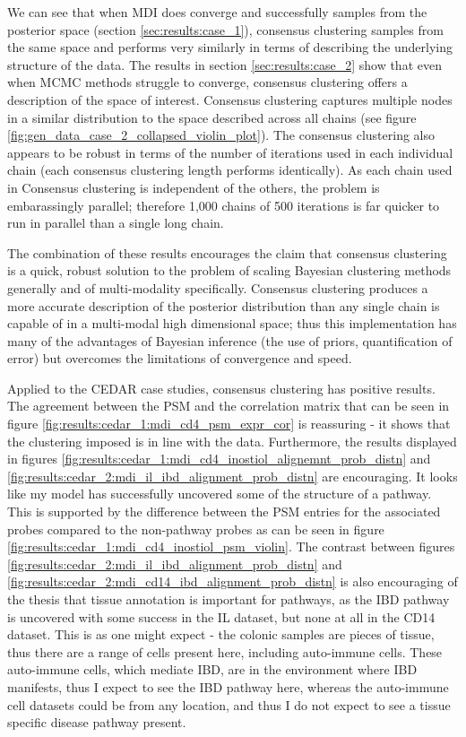 \documentclass[12pt]{article} %
\begin{document}
	We can see that when MDI does converge and successfully samples from the posterior space (section \ref{sec:results:case_1}), consensus clustering samples from the same space and performs very similarly in terms of describing the underlying structure of the data. The results in section \ref{sec:results:case_2} show that even when MCMC methods struggle to converge, consensus clustering offers a description of the space of interest. Consensus clustering captures multiple nodes in a similar distribution to the space described across all chains (see figure \ref{fig:gen_data_case_2_collapsed_violin_plot}). The consensus clustering also appears to be robust in terms of the number of iterations used in each individual chain (each consensus clustering length performs identically). As each chain used in Consensus clustering is independent of the others, the problem is embarassingly parallel; therefore 1,000 chains of 500 iterations is far quicker to run in parallel than a single long chain.
	
	The combination of these results encourages the claim that consensus clustering is a quick, robust solution to the problem of scaling Bayesian clustering methods generally and of multi-modality specifically. Consensus clustering produces a more accurate description of the posterior distribution than any single chain is capable of in a multi-modal high dimensional space; thus this implementation has many of the advantages of Bayesian inference (the use of priors, quantification of error) but overcomes the limitations of convergence and speed.
	
	Applied to the CEDAR case studies, consensus clustering has positive results. The agreement between the PSM and the correlation matrix that can be seen in figure \ref{fig:results:cedar_1:mdi_cd4_psm_expr_cor} is reassuring - it shows that the clustering imposed is in line with the data. Furthermore, the results displayed in figures \ref{fig:results:cedar_1:mdi_cd4_inostiol_alignemnt_prob_distn} and \ref{fig:results:cedar_2:mdi_il_ibd_alignment_prob_distn} are encouraging. It looks like my model has successfully uncovered some of the structure of a pathway. This is supported by the difference between the PSM entries for the associated probes compared to the non-pathway probes as can be seen in figure \ref{fig:results:cedar_1:mdi_cd4_inostiol_psm_violin}. The contrast between figures \ref{fig:results:cedar_2:mdi_il_ibd_alignment_prob_distn} and \ref{fig:results:cedar_2:mdi_cd14_ibd_alignment_prob_distn} is also encouraging of the thesis that tissue annotation is important for pathways, as the IBD pathway is uncovered with some success in the IL dataset, but none at all in the CD14 dataset. This is as one might expect - the colonic samples are pieces of tissue, thus there are a range of cells present here, including auto-immune cells. These auto-immune cells, which mediate IBD, are in the environment where IBD manifests, thus I expect to see the IBD pathway here, whereas the auto-immune cell datasets could be from any location, and thus I do not expect to see a tissue specific disease pathway present.
	
\end{document}
